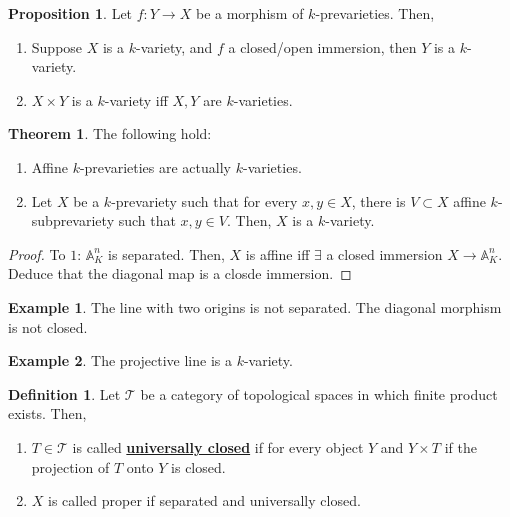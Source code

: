 \documentclass{article}
\theoremstyle{definition}
\newtheorem{theorem}{Theorem}[section]
\theoremstyle{definition}
\newtheorem{definition}{Definition}[theorem]
\theoremstyle{definition}
\theoremstyle{definition}
\newtheorem{proposition}{Proposition}[theorem]
\theoremstyle{definition}
\theoremstyle{definition}
\theoremstyle{definition}
\newtheorem{example}{Example}[theorem]
\begin{document}
\begin{tcolorbox}[colback=blue!5!white,colframe=blue!30!white]
\begin{proposition}
Let $f: Y\to X$ be a morphism of $k$-prevarieties. Then,
\begin{enumerate}
    \item Suppose $X$ is a $k$-variety, and $f$ a closed/open immersion, then $Y$ is a $k$-variety.
    \item $X\times Y$ is a $k$-variety iff $X,Y$ are $k$-varieties. 
\end{enumerate}
\end{proposition}
\end{tcolorbox}


\begin{tcolorbox}[colback=red!5!white,colframe=red!30!white]
\begin{theorem}
    The following hold:
    \begin{enumerate}
        \item Affine $k$-prevarieties are actually $k$-varieties.
        \item Let $X$ be a $k$-prevariety such that for every $x,y\in X$, there is $V\subset X$ affine $k$-subprevariety such that $x,y\in V$. Then, $X$ is a $k$-variety.  
    \end{enumerate}
\end{theorem}
\end{tcolorbox}
\begin{proof}
    To $1$: $\mathbb{A}^n_K$ is separated. Then, $X$ is affine iff $\exists$ a closed immersion $X\to \mathbb{A}_K^n$. Deduce that the diagonal map is a closde immersion. 
\end{proof}


\begin{tcolorbox}[colback=yellow!5!white,colframe=yellow!30!white]
\begin{example}
The line with two origins is not separated. The diagonal morphism is not closed. 
\end{example}
\end{tcolorbox}


\begin{tcolorbox}[colback=yellow!5!white,colframe=yellow!30!white]
\begin{example}
The projective line is a $k$-variety. 
\end{example}
\end{tcolorbox}


\begin{tcolorbox}[colback=purple!5!white,colframe=purple!75!black]
\begin{definition}
Let $\mathcal{T}$ be a category of topological spaces in which finite product exists. Then,
\begin{enumerate}
    \item $T\in \mathcal{T}$ is called \underline{\textbf{universally closed}} if for every object $Y$ and $Y\times T$ if the projection of $T$ onto $Y$ is closed. 
    \item $X$ is called proper if separated and universally closed. 
\end{enumerate}
\end{definition}
\end{tcolorbox}
\end{document}
